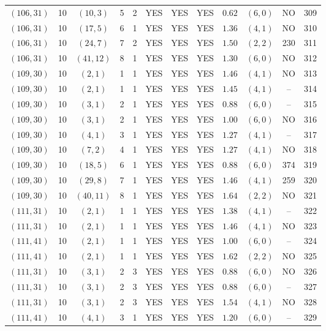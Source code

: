 \begin{longtable}{|c|c|c|c|c|c|c|c|c|c|c|c|}
$(106,31)$ & 10 & $(10,3)$ & 5 & 2 & YES & YES & YES & $0.62$ & $(6,0)$ & NO & 309\\
$(106,31)$ & 10 & $(17,5)$ & 6 & 1 & YES & YES & YES & $1.36$ & $(4,1)$ & NO & 310\\
$(106,31)$ & 10 & $(24,7)$ & 7 & 2 & YES & YES & YES & $1.50$ & $(2,2)$ & 230 & 311\\
$(106,31)$ & 10 & $(41,12)$ & 8 & 1 & YES & YES & YES & $1.30$ & $(6,0)$ & NO & 312\\
$(109,30)$ & 10 & $(2,1)$ & 1 & 1 & YES & YES & YES & $1.46$ & $(4,1)$ & NO & 313\\
$(109,30)$ & 10 & $(2,1)$ & 1 & 1 & YES & YES & YES & $1.45$ & $(4,1)$ & -- & 314\\
$(109,30)$ & 10 & $(3,1)$ & 2 & 1 & YES & YES & YES & $0.88$ & $(6,0)$ & -- & 315\\
$(109,30)$ & 10 & $(3,1)$ & 2 & 1 & YES & YES & YES & $1.00$ & $(6,0)$ & NO & 316\\
$(109,30)$ & 10 & $(4,1)$ & 3 & 1 & YES & YES & YES & $1.27$ & $(4,1)$ & -- & 317\\
$(109,30)$ & 10 & $(7,2)$ & 4 & 1 & YES & YES & YES & $1.27$ & $(4,1)$ & NO & 318\\
$(109,30)$ & 10 & $(18,5)$ & 6 & 1 & YES & YES & YES & $0.88$ & $(6,0)$ & 374 & 319\\
$(109,30)$ & 10 & $(29,8)$ & 7 & 1 & YES & YES & YES & $1.46$ & $(4,1)$ & 259 & 320\\
$(109,30)$ & 10 & $(40,11)$ & 8 & 1 & YES & YES & YES & $1.64$ & $(2,2)$ & NO & 321\\
$(111,31)$ & 10 & $(2,1)$ & 1 & 1 & YES & YES & YES & $1.38$ & $(4,1)$ & -- & 322\\
$(111,31)$ & 10 & $(2,1)$ & 1 & 1 & YES & YES & YES & $1.46$ & $(4,1)$ & NO & 323\\
$(111,41)$ & 10 & $(2,1)$ & 1 & 1 & YES & YES & YES & $1.00$ & $(6,0)$ & -- & 324\\
$(111,41)$ & 10 & $(2,1)$ & 1 & 1 & YES & YES & YES & $1.62$ & $(2,2)$ & NO & 325\\
$(111,31)$ & 10 & $(3,1)$ & 2 & 3 & YES & YES & YES & $0.88$ & $(6,0)$ & NO & 326\\
$(111,31)$ & 10 & $(3,1)$ & 2 & 3 & YES & YES & YES & $0.88$ & $(6,0)$ & -- & 327\\
$(111,31)$ & 10 & $(3,1)$ & 2 & 3 & YES & YES & YES & $1.54$ & $(4,1)$ & NO & 328\\
$(111,41)$ & 10 & $(4,1)$ & 3 & 1 & YES & YES & YES & $1.20$ & $(6,0)$ & -- & 329\\

\end{longtable}
